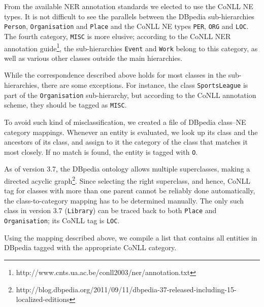 \documentclass[11pt]{article}
\begin{document}
From the available NER annotation standards we elected to use the CoNLL \cite{Tjong:03} NE types. It is not difficult to see the parallels between the DBpedia sub-hierarchies \texttt{Person}, \texttt{Organisation} and \texttt{Place} and the CoNLL NE types \texttt{PER}, \texttt{ORG} and \texttt{LOC}. The fourth category, \texttt{MISC} is more elusive; according to the CoNLL NER annotation guide\footnote{http://www.cnts.ua.ac.be/conll2003/ner/annotation.txt}, the sub-hierarchies \texttt{Event} and \texttt{Work} belong to this category, as well as various other classes outside the main hierarchies. 

While the correspondence described above holds for most classes in the sub-hierarchies, there are some exceptions. For instance, the class \texttt{SportsLeague} is part of the \texttt{Organisation} sub-hierarchy, but according to the CoNLL annotation scheme, they should be tagged as \texttt{MISC}. 

To avoid such kind of misclassification, 
we created a file of DBpedia class--NE category mappings. Whenever an entity is evaluated, we look up its class and the ancestors of its class, and assign to it the category of the class that matches it most closely. If no match is found, the entity is tagged with \texttt{O}. 

As of version 3.7, the DBpedia ontology allows multiple superclasses, making a directed acyclic graph\footnote{http://blog.dbpedia.org/2011/09/11/dbpedia-37-released-including-15-localized-editions}. Since selecting the right superclass, and hence, CoNLL tag for classes with more than one parent cannot be reliably done automatically, the class-to-category mapping has to be determined manually. The only such class in version 3.7 (\texttt{Library}) can be traced back to both \texttt{Place} and \texttt{Organisation}; its CoNLL tag is \texttt{LOC}.


Using the mapping described above, we compile a list that contains all entities in DBpedia tagged with the appropriate CoNLL category.
\end{document}
